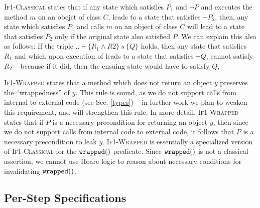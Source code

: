  \textsc{If1-Classical} states that  
if any state which satisfies $P_1$ and $\neg P$ and executes  the method $m$ on an obejct of class $C$, leads to a state that satisfies $\neg P_2$, then, any state which satisfies $P_1$ and calls $m$ on an object of class $C$ will lead to a state that satisfies $P_2$ only if the original state also satisfied $P$.
We can explain this also as follows: If the triple $.. \vdash \{R_1 \wedge R2\}\ s\ \{Q\}$ holds, then any state that satisfies $R_1$ and which upon execution of  leads to a state that satisfies $\neg Q$, cannot satisfy $R_2$ -- because  if it did, then the ensuing state would have to satisfy $Q$,
 


 
\textsc{If1-Wrapped} states that a method which does not return an object $y$ 
preserves the ``wrappedness'' of $y$. 
This rule is sound, as we do not support calls from internal to external code (see Sec. \ref{types})
-- in further work we plan to weaken this requirement, and will  
strengthen this rule.
In more detail,  \textsc{If1-Wrapped}   states that if $P$ is
a necessary precondition for returning an object $y$, then  
since we do not support calls from internal code to external code,
it follows that $P$ is a necessary precondition to leak $y$.
\textsc{If1-Wrapped}  is essentially  a specialized version of \textsc{If1-Classical}
for the $\texttt{wrapped}(  )$ predicate. Since $\texttt{wrapped}(  )$ is not a classical
assertion, we cannot use Hoare logic to reason about necessary conditions
for invalidating $\texttt{wrapped}(  )$.
 
 
 

\subsection{Per-Step \Nec Specifications}
\label{s:module-proof}

